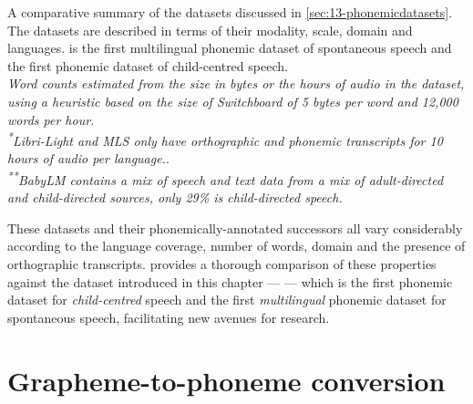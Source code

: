\begin{sidewaystable}
\begin{threeparttable}
        \caption{A comparative summary of the datasets discussed in \cref{sec:13-phonemicdatasets}. The datasets are described in terms of their modality, scale, domain and languages. \ipachildes is the first multilingual phonemic dataset of spontaneous speech and the first phonemic dataset of child-centred speech. \\\emph{\textdagger Word counts estimated from the size in bytes or the hours of audio in the dataset, using a heuristic based on the size of Switchboard of 5 bytes per word and 12,000 words per hour.}\\\emph{\textsuperscript{*}Libri-Light and MLS only have orthographic and phonemic transcripts for 10 hours of audio per language.}.\\\emph{\textsuperscript{**}BabyLM contains a mix of speech and text data from a mix of adult-directed and child-directed sources, only 29\% is child-directed speech.}}
        \label{tab:13-dataset-properties}
    \end{threeparttable}
\end{sidewaystable}

These datasets and their phonemically-annotated successors all vary considerably according to the language coverage, number of words, domain and the presence of orthographic transcripts.  provides a thorough comparison of these properties against the dataset introduced in this chapter --- \ipachildes --- which is the first phonemic dataset for \emph{child-centred} speech and the first \emph{multilingual} phonemic dataset for spontaneous speech, facilitating new avenues for research. 

\section{Grapheme-to-phoneme conversion}\label{sec:13-g2p}



